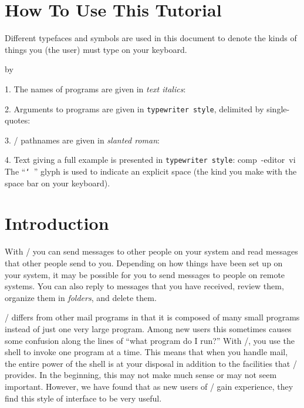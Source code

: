 \section{How To Use This Tutorial}
Different typefaces and symbols are used in this document to denote the
kinds of things you (the user) must type on your keyboard.
\smallskip
{\advance\leftskip by\parindent
\item{1.} The names of programs are given in {\it text italics}:
\smallskip\hskip 1in \smallskip
\item{2.} Arguments to programs are given in {\tt typewriter style},
delimited by single-quotes:
\smallskip\hskip 1in \smallskip
\item{3.} \unix/ pathnames are given in {\sl slanted roman}:
\smallskip\hskip 1in \smallskip
\item{4.} Text giving a full example is presented in {\tt typewriter style}:
\example comp\ -editor\ vi\endexample
The ``\hbox{\tt\char`\ }'' glyph %
is used to indicate an explicit space (the kind you make with the
space bar on your keyboard).
\smallskip}

\section{Introduction}
With \MH/ you can send messages to other people on your system
and read messages that other people send to you.
Depending on how things have been set up on your system,
it may be possible for you to send messages to people on remote systems.
You can also reply to messages that you have received,
review them,
organize them in {\it folders},
and delete them.

\MH/ differs from other mail programs in that it is composed of many
small programs instead of just one very large program.
Among new users this sometimes causes some confusion
along the lines of ``what program do I run?''
With \MH/, you use the shell to invoke one program at a time.
This means that when you handle mail,
the entire power of the shell is at your disposal
in addition to the facilities that \MH/ provides.
In the beginning, this may not make much sense or may not seem important.
However, we have found that as new users of \MH/ gain experience, 
they find this style of interface to be very useful.

